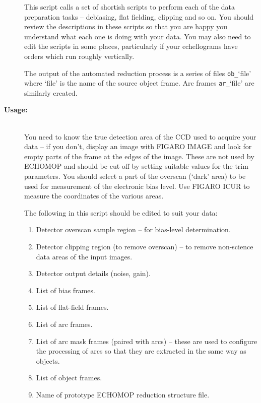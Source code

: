 \documentclass[twoside,11pt]{article}
\newcommand{\xref}[3]{#1}
\newcommand{\scspec}[2]{#1}
\newcommand{\scspec}[2]{#2}
\begin{document}
\begin{description}
     This script calls a set of shortish scripts to perform each of the
     data preparation tasks \scspec{--}{-} debiasing, flat fielding,
     clipping and so on.
     You should review the descriptions in these scripts so that you are
     happy you understand what each one is doing with your data.  You may
     also need to edit the scripts in some places, particularly if your
     echellograms have orders which run roughly vertically.

     The output of the automated reduction process is a series of
     files \verb+ob_+`file' where `file' is the name of the source object
     frame.
     Arc frames \verb+ar_+`file' are similarly created.

\item [{\bf Usage:}] \mbox{} \\
     You need to know the true detection area of the CCD used to acquire
     your data \scspec{--}{-} if you don't, display an image with
     \xref{FIGARO}{sun86}{} \xref{IMAGE}{sun86}{IMAGE} and
     look for empty parts of the frame at the edges of the image.
     These are not used by ECHOMOP and should be cut off by setting
     suitable values for the trim parameters.  You should select a part
     of the overscan (`dark' area) to be used for measurement of the
     electronic bias level.
     Use FIGARO \xref{ICUR}{sun86}{ICUR} to measure the coordinates of the
     various areas.

     The following in this script should be edited to suit your data:

\begin{enumerate}

\item Detector overscan sample region \scspec{--}{-} for bias-level
      determination.
\item Detector clipping region (to remove overscan) \scspec{--}{-} to remove
      non-science data areas of the input images.
\item Detector output details (noise, gain).
\item List of bias frames.
\item List of flat-field frames.
\item List of arc frames.
\item List of arc mask frames (paired with arcs) \scspec{--}{-} these are
      used to configure the processing of arcs so that they are extracted
      in the same way as objects.
\item List of object frames.
\item Name of prototype ECHOMOP reduction structure file.


\end{enumerate}
\end{description}
\end{document}
